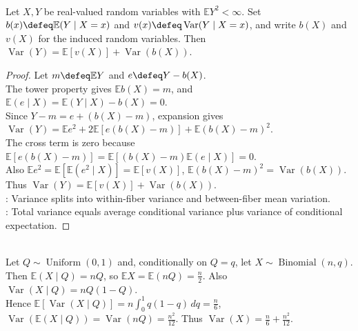 \begin{theorem} \label{thm:law-total-variance} \\
Let $X,Y$ be real-valued random variables with $\mathbb{E}Y^2<\infty$.
Set $b(x)\defeq\mathbb{E}(Y\mid X=x)$ and $v(x)\defeq\operatorname{Var}(Y\mid X=x)$, and write $b(X)$ and $v(X)$ for the induced random variables.
Then $\operatorname{Var}(Y)=\mathbb{E}[v(X)]+\operatorname{Var}(b(X))$.
\begin{proof}
Let $m\defeq\mathbb{E}Y$ and $e\defeq Y-b(X)$.\\
The tower property gives $\mathbb{E}b(X)=m$, and $\mathbb{E}(e\mid X)=\mathbb{E}(Y\mid X)-b(X)=0$.\\
Since $Y-m=e+(b(X)-m)$, expansion gives $\operatorname{Var}(Y)=\mathbb{E}e^2+2\mathbb{E}[e(b(X)-m)]+\mathbb{E}(b(X)-m)^2$.\\
The cross term is zero because $\mathbb{E}[e(b(X)-m)]=\mathbb{E}[(b(X)-m)\mathbb{E}(e\mid X)]=0$.\\
Also $\mathbb{E}e^2=\mathbb{E}[\mathbb{E}(e^2\mid X)]=\mathbb{E}[v(X)]$, $\mathbb{E}(b(X)-m)^2=\operatorname{Var}(b(X))$. Thus $\operatorname{Var}(Y)=\mathbb{E}[v(X)]+\operatorname{Var}(b(X))$.\\
: Variance splits into within-fiber variance and between-fiber mean variation.\\
: Total variance equals average conditional variance plus variance of conditional expectation.
\end{proof}
\end{theorem}

\begin{example} \label{ex:total-variance-random-binomial-proportion} \\
Let $Q\sim\operatorname{Uniform}(0,1)$ and, conditionally on $Q=q$, let $X\sim\operatorname{Binomial}(n,q)$.\\
Then $\mathbb{E}(X\mid Q)=nQ$, so $\mathbb{E}X=\mathbb{E}(nQ)=\frac{n}{2}$. Also $\operatorname{Var}(X\mid Q)=nQ(1-Q)$.\\
Hence $\mathbb{E}[\operatorname{Var}(X\mid Q)]=n\int_0^1q(1-q)\,dq=\frac{n}{6}$, $\operatorname{Var}(\mathbb{E}(X\mid Q))=\operatorname{Var}(nQ)=\frac{n^2}{12}$. Thus $\operatorname{Var}(X)=\frac{n}{6}+\frac{n^2}{12}$.
\end{example}

